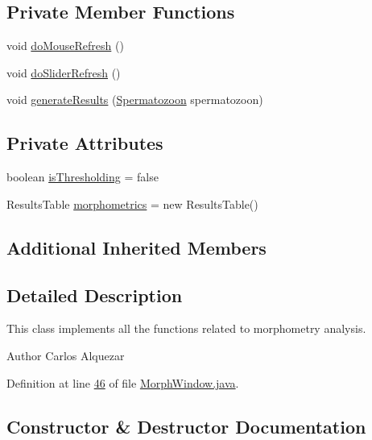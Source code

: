 \subsection*{Private Member Functions}
\begin{DoxyCompactItemize}
\item 
void \hyperlink{classgui_1_1_morph_window_a5f99d67f201dbf538b692337cd3af654}{do\+Mouse\+Refresh} ()
\item 
void \hyperlink{classgui_1_1_morph_window_a7db6c32207f03c20a1b7932a5f804435}{do\+Slider\+Refresh} ()
\item 
void \hyperlink{classgui_1_1_morph_window_ad0a9220fe384d0c206692bc041ef4bb6}{generate\+Results} (\hyperlink{classdata_1_1_spermatozoon}{Spermatozoon} spermatozoon)
\end{DoxyCompactItemize}
\subsection*{Private Attributes}
\begin{DoxyCompactItemize}
\item 
boolean \hyperlink{classgui_1_1_morph_window_a3c3ae31647b93ff77785eb37236fbcb7}{is\+Thresholding} = false
\item 
Results\+Table \hyperlink{classgui_1_1_morph_window_a05b8759be1c0c0351258f5519d12914f}{morphometrics} = new Results\+Table()
\end{DoxyCompactItemize}
\subsection*{Additional Inherited Members}


\subsection{Detailed Description}
This class implements all the functions related to morphometry analysis.

\begin{DoxyAuthor}{Author}
Carlos Alquezar 
\end{DoxyAuthor}


Definition at line \hyperlink{_morph_window_8java_source_l00046}{46} of file \hyperlink{_morph_window_8java_source}{Morph\+Window.\+java}.



\subsection{Constructor \& Destructor Documentation}
\hypertarget{classgui_1_1_morph_window_a4100873aa2e4bc183cd06aefb7719448}{}\label{classgui_1_1_morph_window_a4100873aa2e4bc183cd06aefb7719448} 
